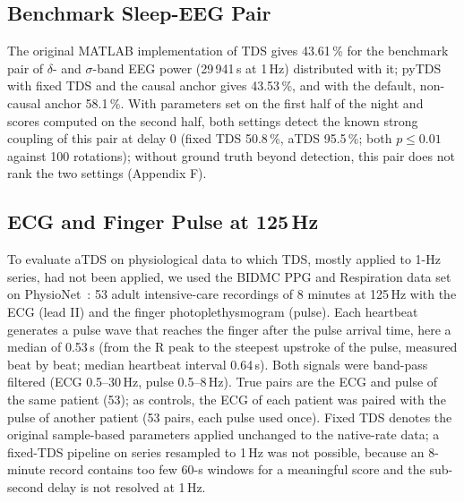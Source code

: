 \documentclass[11pt,a4paper]{article}
\begin{document}
\subsection{Benchmark Sleep-EEG Pair}
\label{sec:res-benchmark}
The original MATLAB implementation of TDS gives 43.61\,\% for the benchmark pair of $\delta$- and $\sigma$-band EEG power (29\,941\,s at 1\,Hz) distributed with it; pyTDS with fixed TDS and the causal anchor gives 43.53\,\%, and with the default, non-causal anchor 58.1\,\%. With parameters set on the first half of the night and scores computed on the second half, both settings detect the known strong coupling of this pair at delay 0 (fixed TDS 50.8\,\%, aTDS 95.5\,\%; both $p \le 0.01$ against 100 rotations); without ground truth beyond detection, this pair does not rank the two settings (Appendix F).

\subsection{ECG and Finger Pulse at 125\,Hz}
\label{sec:res-bidmc}
To evaluate aTDS on physiological data to which TDS, mostly applied to 1-Hz series, had not been applied, we used the BIDMC PPG and Respiration data set on PhysioNet~\cite{Pimentel2017BIDMC,Goldberger2000PhysioNet}: 53 adult intensive-care recordings of 8 minutes at 125\,Hz with the ECG (lead II) and the finger photoplethysmogram (pulse). Each heartbeat generates a pulse wave that reaches the finger after the pulse arrival time, here a median of 0.53\,s (from the R peak to the steepest upstroke of the pulse, measured beat by beat; median heartbeat interval 0.64\,s). Both signals were band-pass filtered (ECG 0.5--30\,Hz, pulse 0.5--8\,Hz). True pairs are the ECG and pulse of the same patient (53); as controls, the ECG of each patient was paired with the pulse of another patient (53 pairs, each pulse used once). Fixed TDS denotes the original sample-based parameters applied unchanged to the native-rate data; a fixed-TDS pipeline on series resampled to 1\,Hz was not possible, because an 8-minute record contains too few 60-s windows for a meaningful score and the sub-second delay is not resolved at 1\,Hz.
\end{document}
